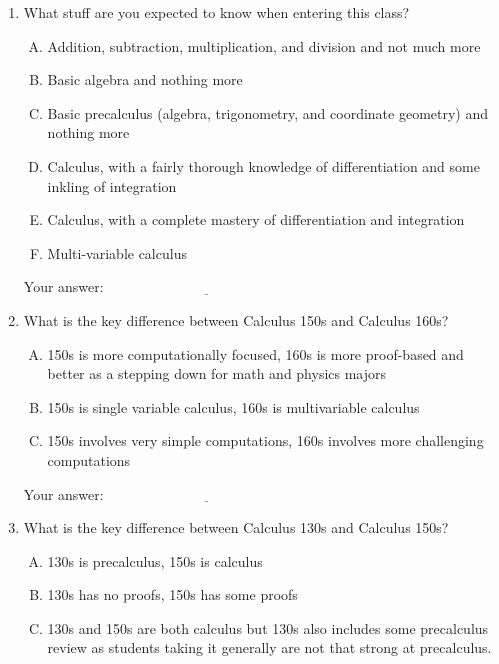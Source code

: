 \documentclass[10pt]{amsart}
\begin{document}
\begin{enumerate}
\item What stuff are you expected to know when entering this class?

  \begin{enumerate}[(A)]
  \item Addition, subtraction, multiplication, and division and not much more
  \item Basic algebra and nothing more
  \item Basic precalculus (algebra, trigonometry, and coordinate geometry) and nothing more
  \item Calculus, with a fairly thorough knowledge of differentiation and some inkling of integration
  \item Calculus, with a complete mastery of differentiation and integration
  \item Multi-variable calculus
  \end{enumerate}

  \vspace{0.1in}
  Your answer: $\underline{\qquad\qquad\qquad\qquad\qquad\qquad\qquad}$
  \vspace{0.1in}
  
\item What is the key difference between Calculus 150s and Calculus 160s?

  \begin{enumerate}[(A)]
  \item 150s is more computationally focused, 160s is more proof-based
    and better as a stepping down for math and physics majors
  \item 150s is single variable calculus, 160s is multivariable calculus
  \item 150s involves very simple computations, 160s involves more challenging computations
  \end{enumerate}

  \vspace{0.1in}
  Your answer: $\underline{\qquad\qquad\qquad\qquad\qquad\qquad\qquad}$
  \vspace{0.1in}

\item What is the key difference between Calculus 130s and Calculus 150s?

  \begin{enumerate}[(A)]
  \item 130s is precalculus, 150s is calculus
  \item 130s has no proofs, 150s has some proofs
  \item 130s and 150s are both calculus but 130s also includes some
    precalculus review as students taking it generally are not that
    strong at precalculus.
  \end{enumerate}


\end{enumerate}
\end{document}
